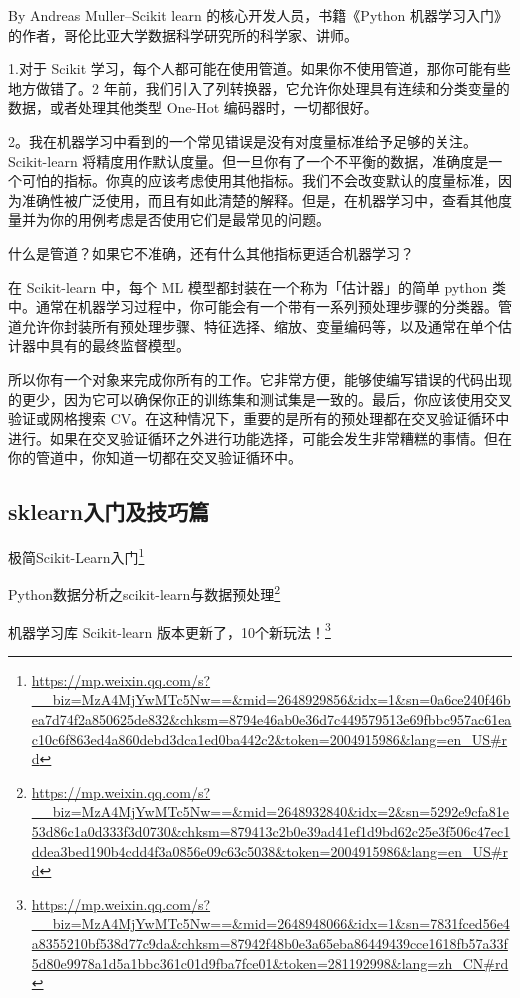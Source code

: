 \documentclass[]{ctexbook}
\renewcommand{\href}[2]{#2\footnote{\url{#1}}}
\begin{document}
By Andreas Muller--Scikit learn 的核心开发人员，书籍《Python 机器学习入门》的作者，哥伦比亚大学数据科学研究所的科学家、讲师。

1.对于 Scikit 学习，每个人都可能在使用管道。如果你不使用管道，那你可能有些地方做错了。2 年前，我们引入了列转换器，它允许你处理具有连续和分类变量的数据，或者处理其他类型 One-Hot 编码器时，一切都很好。

2。我在机器学习中看到的一个常见错误是没有对度量标准给予足够的关注。Scikit-learn 将精度用作默认度量。但一旦你有了一个不平衡的数据，准确度是一个可怕的指标。你真的应该考虑使用其他指标。我们不会改变默认的度量标准，因为准确性被广泛使用，而且有如此清楚的解释。但是，在机器学习中，查看其他度量并为你的用例考虑是否使用它们是最常见的问题。

什么是管道？如果它不准确，还有什么其他指标更适合机器学习？

在 Scikit-learn 中，每个 ML 模型都封装在一个称为「估计器」的简单 python 类中。通常在机器学习过程中，你可能会有一个带有一系列预处理步骤的分类器。管道允许你封装所有预处理步骤、特征选择、缩放、变量编码等，以及通常在单个估计器中具有的最终监督模型。

所以你有一个对象来完成你所有的工作。它非常方便，能够使编写错误的代码出现的更少，因为它可以确保你正的训练集和测试集是一致的。最后，你应该使用交叉验证或网格搜索 CV。在这种情况下，重要的是所有的预处理都在交叉验证循环中进行。如果在交叉验证循环之外进行功能选择，可能会发生非常糟糕的事情。但在你的管道中，你知道一切都在交叉验证循环中。

\hypertarget{sklearnux5165ux95e8ux53caux6280ux5de7ux7bc7}{%
\subsection{sklearn入门及技巧篇}\label{sklearnux5165ux95e8ux53caux6280ux5de7ux7bc7}}

\href{https://mp.weixin.qq.com/s?__biz=MzA4MjYwMTc5Nw==\&mid=2648929856\&idx=1\&sn=0a6ce240f46bea7d74f2a850625de832\&chksm=8794e46ab0e36d7c449579513e69fbbc957ac61eac10c6f863ed4a860debd3dca1ed0ba442c2\&token=2004915986\&lang=en_US\#rd}{极简Scikit-Learn入门}

\href{https://mp.weixin.qq.com/s?__biz=MzA4MjYwMTc5Nw==\&mid=2648932840\&idx=2\&sn=5292e9cfa81e53d86c1a0d333f3d0730\&chksm=879413c2b0e39ad41ef1d9bd62c25e3f506c47ec1ddea3bed190b4cdd4f3a0856e09c63c5038\&token=2004915986\&lang=en_US\#rd}{Python数据分析之scikit-learn与数据预处理​}

\href{https://mp.weixin.qq.com/s?__biz=MzA4MjYwMTc5Nw==\&mid=2648948066\&idx=1\&sn=7831fced56e4a8355210bf538d77c9da\&chksm=87942f48b0e3a65eba86449439cce1618fb57a33f5d80e9978a1d5a1bbc361c01d9fba7fce01\&token=281192998\&lang=zh_CN\#rd}{机器学习库 Scikit-learn 版本更新了，10个新玩法！}
\end{document}
